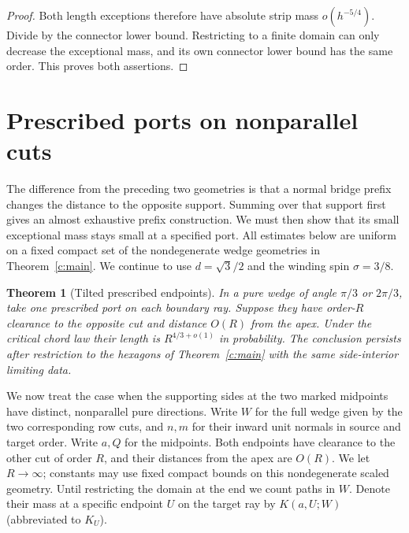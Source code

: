 \documentclass[11pt]{article}
\numberwithin{equation}{section}
\newtheorem{theorem}{Theorem}[section]
\theoremstyle{definition}\newtheorem{definition}[theorem]{Definition}
\theoremstyle{remark}\newtheorem{remark}[theorem]{Remark}
\begin{document}
\begin{proof}
Both length exceptions therefore have absolute strip mass
$o(h^{-5/4})$.  Divide by the connector lower bound.  Restricting to a
finite domain can only decrease the exceptional mass, and its own
connector lower bound has the same order.  This proves both assertions.
\end{proof}

\section{Prescribed ports on nonparallel cuts}\label{c:tilted}
The difference from the preceding two geometries is that a normal bridge
prefix changes the distance to the opposite support. Summing over that
support first gives an almost exhaustive prefix construction. We must
then show that its small exceptional mass stays small at a specified port.
All estimates below are uniform on a fixed compact set of the
nondegenerate wedge geometries in Theorem~\ref{c:main}. We continue to use
$d=\sqrt3/2$ and the winding spin $\sigma=3/8$.

\begin{theorem}[Tilted prescribed endpoints]\label{c:tilted-law}
In a pure wedge of angle $\pi/3$ or $2\pi/3$, take one prescribed port on each boundary ray. Suppose they have order-$R$ clearance to the opposite cut and distance $O(R)$
from the apex. Under the critical chord law their length is
$R^{4/3+o(1)}$ in probability. The conclusion persists after restriction
to the hexagons of Theorem~\ref{c:main} with the same side-interior
limiting data.
\end{theorem}
We now treat the case when the supporting sides at the two marked midpoints have distinct, nonparallel pure directions. Write \(W\) for the full wedge given by the two corresponding row cuts, and \(n,m\) for their inward unit normals in source and target order. Write \(a,Q\) for the midpoints. Both endpoints have clearance to the other cut of order \(R\), and their distances from the apex are \(O(R)\). We let \(R\to\infty\); constants may use fixed compact bounds on this nondegenerate scaled geometry. Until restricting the domain at the end we count paths in \(W\). Denote their mass at a specific endpoint \(U\) on the target ray by \(K(a,U;W)\) (abbreviated to \(K_U\)).
\end{document}
